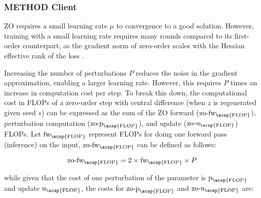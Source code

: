 \subsubsection{\acs{METHOD} Client}
\label{subsec:client_trianing}
\begin{comment}
\begin{figure}[tb!]
    \centering
    
    \caption{Rounds to converge for FedAvg and ZO-FL for finetuning SST2 dataset. zero-orderrequires a small learning rate to converge which results in slower converge to first-order SGD ($\approx 40\times$). }
    \label{fig:slow_convergence}
\end{figure}
\end{comment}

\acl{ZO} requires a small learning rate $\mu$ to convergence to a good solution. However, training with a small learning rate requires many rounds compared to its first-order counterpart, as the gradient norm of zero-order scales with the Hessian effective rank of the loss \cite{malladi2023fine}. 


Increasing the number of perturbations $P$ reduces the noise in the gradient approximation, enabling a larger learning rate. However, this requires $P$ times an increase in computation cost per step.  To break this down, the computational cost in \acp{FLOP} of a zero-order step with central difference (when $z$ is regenerated given seed $s$) can be expressed as the sum of the ZO forward ($\text{zo-fw}_{\text{\acsp{FLOP}}}$), perturbation computation ($\text{zo-p}_{\text{\acsp{FLOP}}}$), and update ($\text{zo-u}_{\text{\acsp{FLOP}}}$) \acp{FLOP}. Let $\text{fw}_{\text{\acsp{FLOP}}}$ represent \acp{FLOP} for doing one forward pass (inference) on the input, $\text{zo-fw}_{\text{\acsp{FLOP}}}$ can be defined as follows:

\begin{equation}
    \text{zo-fw}_{\text{\acsp{FLOP}}}= 2 \times \text{fw}_{\text{\acsp{FLOP}}} \times P
\end{equation}

while given that the cost of one perturbation of the parameter is $\text{p}_{\text{\acsp{FLOP}}}$ and update $\text{u}_{\text{\acsp{FLOP}}}$, the costs for $\text{zo-p}_{\text{\acsp{FLOP}}}$ and $\text{zo-u}_{\text{\acsp{FLOP}}}$ are: 

